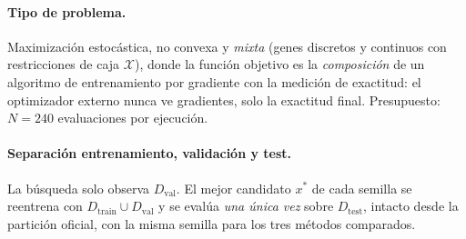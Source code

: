 \paragraph{Tipo de problema.}
Maximización estocástica, no convexa y \emph{mixta} (genes discretos y continuos con restricciones de caja $\mathcal{X}$), donde la función objetivo es la \emph{composición} de un algoritmo de entrenamiento por gradiente con la medición de exactitud: el optimizador externo nunca ve gradientes, solo la exactitud final. Presupuesto: $N = 240$ evaluaciones por ejecución.

\paragraph{Separación entrenamiento, validación y test.}
La búsqueda solo observa $D_{\text{val}}$. El mejor candidato $x^*$ de cada semilla se reentrena con $D_{\text{train}} \cup D_{\text{val}}$ y se evalúa \emph{una única vez} sobre $D_{\text{test}}$, intacto desde la partición oficial, con la misma semilla para los tres métodos comparados.
